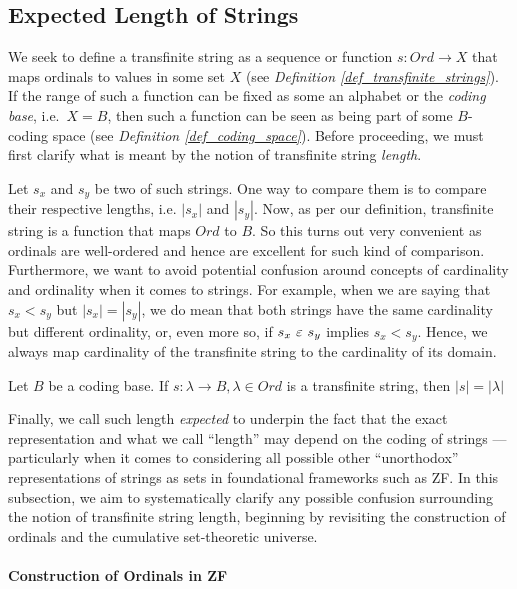 \subsection{Expected Length of Strings}\label{subsect_expected_length_of_strings}

We seek to define a transfinite string as a sequence or function $s: Ord \to X$ that maps ordinals to values in some set $X$ (see \textit{Definition \ref{def_transfinite_strings}}). If the range of such a function can be fixed as some an alphabet or the \textit{coding base}, i.e.\ $X = B$, then such a function can be seen as being part of some $B$-coding space (see \textit{Definition \ref{def_coding_space}}). Before proceeding, we must first clarify what is meant by the notion of transfinite string \textit{length}.

Let $s_x$ and $s_y$ be two of such strings. One way to compare them is to compare their respective lengths, i.e. $|s_x|$ and $|s_y|$. Now, as per our definition, transfinite string is a function that maps $Ord$ to $B$. So this turns out very convenient as ordinals are well-ordered and hence are excellent for such kind of comparison. Furthermore, we want to avoid potential confusion around concepts of cardinality and ordinality when it comes to strings. For example, when we are saying that $s_x < s_y$ but $|s_x| = |s_y|$, we do mean that both strings have the same cardinality but different ordinality, or, even more so, if $s_x \ \varepsilon\  s_y$ implies $s_x < s_y$. Hence, we always map cardinality of the transfinite string to the cardinality of its domain.

\begin{definition}\label{def_transfinite_string_length}
    Let $B$ be a coding base. If $s: \lambda \to B, \lambda \in Ord$ is a transfinite string, then $|s| = |\lambda|$
\end{definition}

Finally, we call such length \textit{expected} to underpin the fact that the exact representation and what we call “length” may depend on the coding of strings — particularly when it comes to considering all possible other “unorthodox” representations of strings as sets in foundational frameworks such as ZF. In this subsection, we aim to systematically clarify any possible confusion surrounding the notion of transfinite string length, beginning by revisiting the construction of ordinals and the cumulative set-theoretic universe.

\paragraph{Construction of Ordinals in ZF}

